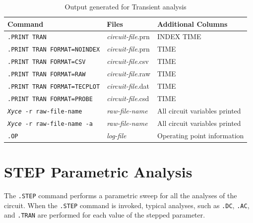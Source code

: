 \begin{table}[htbp]
  \caption{Output generated for Transient analysis \label{Tran_Output_table}}
  \begin{tabularx}{\linewidth}{|p{2.75in}|Y|Y|}
     \color{white}\textbf{Command} & \color{white}\textbf{Files} & \color{white}\textbf{Additional Columns} \\ \hline
\texttt{.PRINT TRAN} & \emph{circuit-file}.prn & INDEX TIME \\ \hline
\texttt{.PRINT TRAN FORMAT=NOINDEX} & \emph{circuit-file}.prn & TIME \\ \hline
\texttt{.PRINT TRAN FORMAT=CSV} & \emph{circuit-file}.csv & TIME \\ \hline
\texttt{.PRINT TRAN FORMAT=RAW} & \emph{circuit-file}.raw & TIME \\ \hline
\texttt{.PRINT TRAN FORMAT=TECPLOT} & \emph{circuit-file}.dat & TIME \\ \hline
\texttt{.PRINT TRAN FORMAT=PROBE} & \emph{circuit-file}.csd & TIME \\ \hline

\texttt{\emph{Xyce} -r raw-file-name} & \emph{raw-file-name} & All circuit variables printed \\ \hline
\texttt{\emph{Xyce} -r raw-file-name -a} & \emph{raw-file-name} & All circuit variables printed \\ \hline

\texttt{.OP} & \emph{log-file} & Operating point information \\ \hline

  \end{tabularx}
\end{table}

\clearpage
\section{STEP Parametric Analysis}
\label{STEP_Analysis}
\label{step_Overview}
 

The \verb|.STEP| command performs a parametric sweep for all the
analyses of the circuit.  When the \verb|.STEP| command is invoked,
typical analyses, such as \verb|.DC|, \verb|.AC|, and \verb|.TRAN| are
performed for each value of the stepped parameter.

